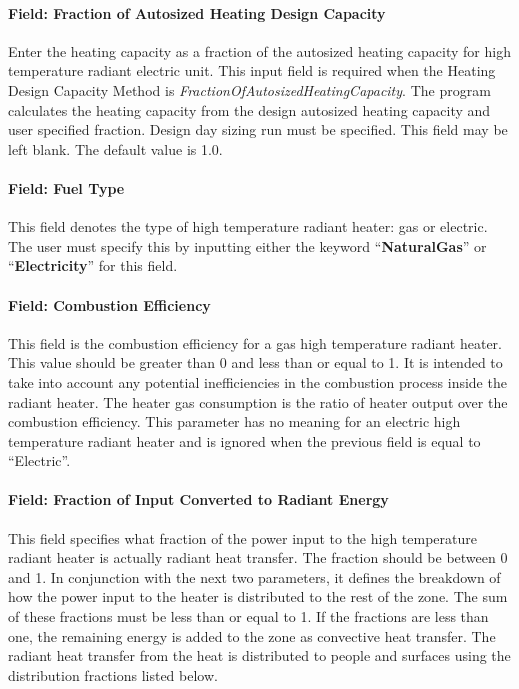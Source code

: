 \paragraph{Field: Fraction of Autosized Heating Design Capacity}\label{field-fraction-of-autosized-heating-design-capacity-7}

Enter the heating capacity as a fraction of the autosized heating capacity for high temperature radiant electric unit. This input field is required when the Heating Design Capacity Method is \emph{FractionOfAutosizedHeatingCapacity}. The program calculates the heating capacity from the design autosized heating capacity and user specified fraction. Design day sizing run must be specified. This field may be left blank. The default value is 1.0.

\paragraph{Field: Fuel Type}\label{field-fuel-type-003}

This field denotes the type of high temperature radiant heater: gas or electric. The user must specify this by inputting either the keyword ``\textbf{NaturalGas}'' or ``\textbf{Electricity}'' for this field.

\paragraph{Field: Combustion Efficiency}\label{field-combustion-efficiency}

This field is the combustion efficiency for a gas high temperature radiant heater. This value should be greater than 0 and less than or equal to 1. It is intended to take into account any potential inefficiencies in the combustion process inside the radiant heater. The heater gas consumption is the ratio of heater output over the combustion efficiency. This parameter has no meaning for an electric high temperature radiant heater and is ignored when the previous field is equal to ``Electric''.

\paragraph{Field: Fraction of Input Converted to Radiant Energy}\label{field-fraction-of-input-converted-to-radiant-energy}

This field specifies what fraction of the power input to the high temperature radiant heater is actually radiant heat transfer. The fraction should be between 0 and 1. In conjunction with the next two parameters, it defines the breakdown of how the power input to the heater is distributed to the rest of the zone. The sum of these fractions must be less than or equal to 1. If the fractions are less than one, the remaining energy is added to the zone as convective heat transfer. The radiant heat transfer from the heat is distributed to people and surfaces using the distribution fractions listed below.


